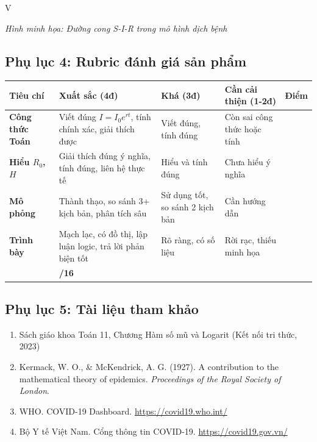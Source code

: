 \documentclass[12pt,a4paper]{article}
\begin{document}
\begin{competitionsection}{V}
\begin{center}
\textit{Hình minh họa: Đường cong S-I-R trong mô hình dịch bệnh}
\end{center}

\subsection*{Phụ lục 4: Rubric đánh giá sản phẩm}

\begin{tabularx}{\textwidth}{|>{\raggedright\arraybackslash}p{2.2cm}|X|X|X|c|}
\hline
\rowcolor{TableHeader}
\sffamily\bfseries Tiêu chí & \sffamily\bfseries Xuất sắc (4đ) & \sffamily\bfseries Khá (3đ) & \sffamily\bfseries Cần cải thiện (1-2đ) & \sffamily\bfseries Điểm \\
\hline
\textbf{Công thức Toán} & Viết đúng $I=I_0 e^{rt}$, tính chính xác, giải thích được & Viết đúng, tính đúng & Còn sai công thức hoặc tính & \\
\hline
\textbf{Hiểu $R_0$, $H$} & Giải thích đúng ý nghĩa, tính đúng, liên hệ thực tế & Hiểu và tính đúng & Chưa hiểu ý nghĩa & \\
\hline
\textbf{Mô phỏng} & Thành thạo, so sánh 3+ kịch bản, phân tích sâu & Sử dụng tốt, so sánh 2 kịch bản & Cần hướng dẫn & \\
\hline
\textbf{Trình bày} & Mạch lạc, có đồ thị, lập luận logic, trả lời phản biện tốt & Rõ ràng, có số liệu & Rời rạc, thiếu minh họa & \\
\hline
\multicolumn{4}{|r|}{\textbf{TỔNG ĐIỂM:}} & \textbf{/16} \\
\hline
\end{tabularx}

\subsection*{Phụ lục 5: Tài liệu tham khảo}

\begin{enumerate}
\item Sách giáo khoa Toán 11, Chương Hàm số mũ và Logarit (Kết nối tri thức, 2023)
\item Kermack, W. O., \& McKendrick, A. G. (1927). A contribution to the mathematical theory of epidemics. \textit{Proceedings of the Royal Society of London}.
\item WHO. COVID-19 Dashboard. \url{https://covid19.who.int/}
\item Bộ Y tế Việt Nam. Cổng thông tin COVID-19. \url{https://covid19.gov.vn/}
\end{enumerate}

\end{competitionsection}
\end{document}
